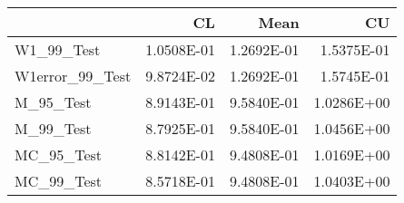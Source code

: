 \begin{tabular}{lrrr}
\toprule
{} &         CL &       Mean &         CU \\
\midrule
W1\_99\_Test      & 1.0508E-01 & 1.2692E-01 & 1.5375E-01 \\
W1error\_99\_Test & 9.8724E-02 & 1.2692E-01 & 1.5745E-01 \\
M\_95\_Test       & 8.9143E-01 & 9.5840E-01 & 1.0286E+00 \\
M\_99\_Test       & 8.7925E-01 & 9.5840E-01 & 1.0456E+00 \\
MC\_95\_Test      & 8.8142E-01 & 9.4808E-01 & 1.0169E+00 \\
MC\_99\_Test      & 8.5718E-01 & 9.4808E-01 & 1.0403E+00 \\
\bottomrule
\end{tabular}
